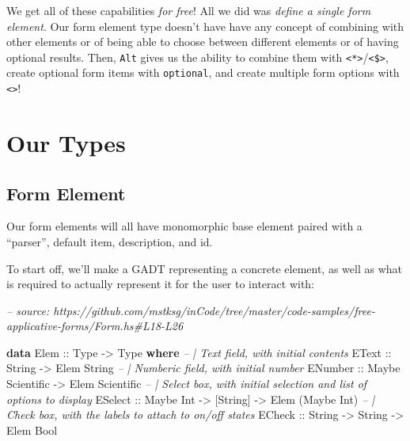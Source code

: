 \documentclass[]{article}
\newenvironment{Shaded}{}{}
\newcommand{\CommentTok}[1]{\textcolor[rgb]{0.38,0.63,0.69}{\textit{#1}}}
\newcommand{\DataTypeTok}[1]{\textcolor[rgb]{0.56,0.13,0.00}{#1}}
\newcommand{\KeywordTok}[1]{\textcolor[rgb]{0.00,0.44,0.13}{\textbf{#1}}}
\newcommand{\NormalTok}[1]{#1}
\newcommand{\OtherTok}[1]{\textcolor[rgb]{0.00,0.44,0.13}{#1}}
\begin{document}
We get all of these capabilities \emph{for free}! All we did was \emph{define a
single form element}. Our form element type doesn't have have any concept of
combining with other elements or of being able to choose between different
elements or of having optional results. Then, \texttt{Alt} gives us the ability
to combine them with
\texttt{\textless{}*\textgreater{}}/\texttt{\textless{}\$\textgreater{}}, create
optional form items with \texttt{optional}, and create multiple form options
with \texttt{\textless{}\textbar{}\textgreater{}}!

\hypertarget{our-types}{%
\section{Our Types}\label{our-types}}

\hypertarget{form-element}{%
\subsection{Form Element}\label{form-element}}

Our form elements will all have monomorphic base element paired with a
``parser'', default item, description, and id.

To start off, we'll make a GADT representing a concrete element, as well as what
is required to actually represent it for the user to interact with:

\begin{Shaded}
\begin{Highlighting}[]
\CommentTok{-- source: https://github.com/mstksg/inCode/tree/master/code-samples/free-applicative-forms/Form.hs#L18-L26}

\KeywordTok{data} \DataTypeTok{Elem}\OtherTok{ ::} \DataTypeTok{Type} \OtherTok{->} \DataTypeTok{Type} \KeywordTok{where}
    \CommentTok{-- | Text field, with initial contents}
    \DataTypeTok{EText}\OtherTok{   ::} \DataTypeTok{String}                \OtherTok{->} \DataTypeTok{Elem} \DataTypeTok{String}
    \CommentTok{-- | Numberic field, with initial number}
    \DataTypeTok{ENumber}\OtherTok{ ::} \DataTypeTok{Maybe} \DataTypeTok{Scientific}      \OtherTok{->} \DataTypeTok{Elem} \DataTypeTok{Scientific}
    \CommentTok{-- | Select box, with initial selection and list of options to display}
    \DataTypeTok{ESelect}\OtherTok{ ::} \DataTypeTok{Maybe} \DataTypeTok{Int} \OtherTok{->}\NormalTok{ [}\DataTypeTok{String}\NormalTok{] }\OtherTok{->} \DataTypeTok{Elem}\NormalTok{ (}\DataTypeTok{Maybe} \DataTypeTok{Int}\NormalTok{)}
    \CommentTok{-- | Check box, with the labels to attach to on/off states}
    \DataTypeTok{ECheck}\OtherTok{  ::} \DataTypeTok{String}    \OtherTok{->} \DataTypeTok{String}   \OtherTok{->} \DataTypeTok{Elem} \DataTypeTok{Bool}
\end{Highlighting}
\end{Shaded}
\end{document}
